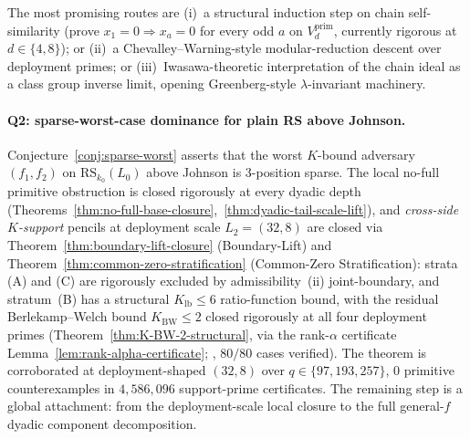 \documentclass[11pt]{article}
\theoremstyle{definition}
\theoremstyle{remark}
\begin{document}
The most promising routes are
(i)~a structural induction step on chain self-similarity
(prove $x_1 = 0 \Rightarrow x_a = 0$ for every odd $a$ on
$V_d^{\mathrm{prim}}$, currently rigorous at $d \in \{4, 8\}$); or
(ii)~a Chevalley--Warning-style modular-reduction descent over
deployment primes; or
(iii)~Iwasawa-theoretic interpretation of the chain ideal as a class
group inverse limit, opening Greenberg-style $\lambda$-invariant
machinery.

\paragraph{Q2: sparse-worst-case dominance for plain RS above
Johnson.}
Conjecture~\ref{conj:sparse-worst} asserts that the worst $K$-bound
adversary $(f_1, f_2)$ on $\mathrm{RS}_{k_0}(L_0)$ above Johnson is
$3$-position sparse. The local no-full primitive obstruction is
closed rigorously at every dyadic depth
(Theorems~\ref{thm:no-full-base-closure},~\ref{thm:dyadic-tail-scale-lift}),
and \emph{cross-side $K$-support} pencils at deployment scale
$L_2 = (32, 8)$ are closed via Theorem~\ref{thm:boundary-lift-closure}
(Boundary-Lift) and Theorem~\ref{thm:common-zero-stratification}
(Common-Zero Stratification): strata (A) and (C) are rigorously
excluded by admissibility~(ii) joint-boundary, and stratum~(B) has a
structural $K_{\mathrm{lb}} \leq 6$ ratio-function bound, with
the residual Berlekamp--Welch bound $K_{\mathrm{BW}} \leq 2$ closed
rigorously at all four deployment primes
(Theorem~\ref{thm:K-BW-2-structural}, via the rank-$\alpha$ certificate
Lemma~\ref{lem:rank-alpha-certificate};
\cite{CompanionRepo}, $80/80$ cases verified).
The theorem is corroborated at deployment-shaped $(32, 8)$
over $q \in \{97, 193, 257\}$, $0$ primitive counterexamples in
$4{,}586{,}096$ support-prime certificates. The remaining step is a
global attachment: from the deployment-scale local closure to the full
general-$f$ dyadic component decomposition.
\end{document}
